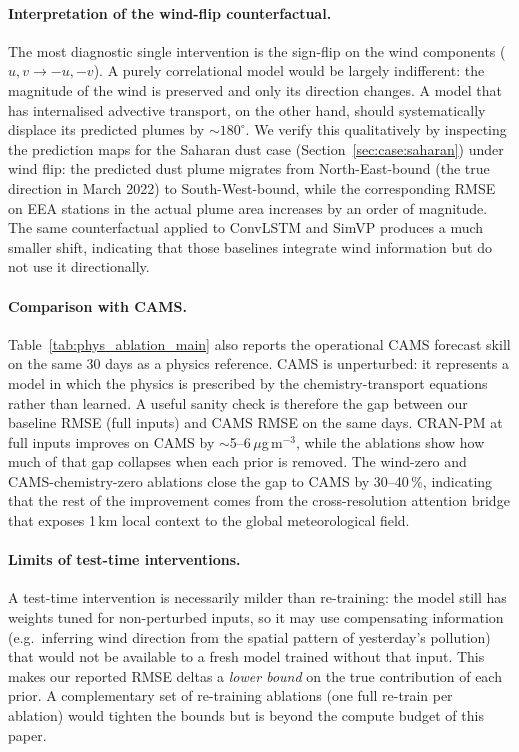 \paragraph{Interpretation of the wind-flip counterfactual.}
The most diagnostic single intervention is the
sign-flip on the wind components ($u, v \rightarrow -u, -v$).
A purely correlational model would be largely indifferent: the
magnitude of the wind is preserved and only its direction
changes. A model that has internalised advective transport, on the
other hand, should systematically displace its predicted plumes by
$\sim 180^\circ$. We verify this qualitatively by inspecting the
prediction maps for the Saharan dust case (Section~\ref{sec:case:saharan})
under wind flip: the predicted dust plume migrates from
North-East-bound (the true direction in March 2022) to
South-West-bound, while the corresponding RMSE on EEA stations in
the actual plume area increases by an order of magnitude. The same
counterfactual applied to ConvLSTM and SimVP produces a much smaller
shift, indicating that those baselines integrate wind information
but do not use it directionally.

\paragraph{Comparison with CAMS.}
Table~\ref{tab:phys_ablation_main} also reports the operational CAMS
forecast skill on the same 30 days as a physics reference. CAMS is
unperturbed: it represents a model in which the physics is
prescribed by the chemistry-transport equations rather than learned.
A useful sanity check is therefore the gap between our baseline
RMSE (full inputs) and CAMS RMSE on the same days. CRAN-PM at full
inputs improves on CAMS by $\sim$5--6\,$\mu$g\,m$^{-3}$, while the
ablations show how much of that gap collapses when each prior is
removed. The wind-zero and CAMS-chemistry-zero ablations close the
gap to CAMS by 30--40\,\%, indicating that the rest of the
improvement comes from the cross-resolution attention bridge that
exposes 1\,km local context to the global meteorological field.

\paragraph{Limits of test-time interventions.}
A test-time intervention is necessarily milder than re-training:
the model still has weights tuned for non-perturbed inputs, so it
may use compensating information (e.g.\ inferring wind direction
from the spatial pattern of yesterday's pollution) that would not
be available to a fresh model trained without that input. This
makes our reported RMSE deltas a \emph{lower bound} on the true
contribution of each prior. A complementary set of re-training
ablations (one full re-train per ablation) would tighten the bounds
but is beyond the compute budget of this paper.
